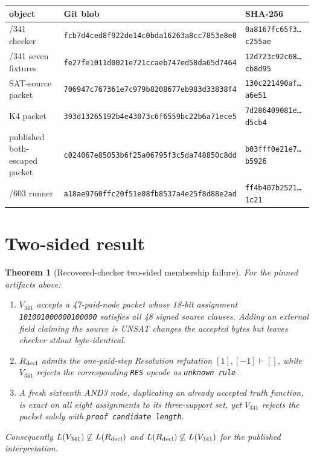 \documentclass[11pt]{article}
\newtheorem{theorem}{Theorem}
\begin{document}
\begin{center}
\small
\begin{tabular}{@{}lll@{}}
\toprule
object & Git blob & SHA-256\\
\midrule
/341 checker & \texttt{fcb7d4ced8f922de14c0bda16263a8cc7853e8e0} & \texttt{0a8167fc65f3\ldots c255ae}\\
/341 seven fixtures & \texttt{fe27fe1011d0021e721ccaeb747ed58da65d7464} & \texttt{12d723c92c68\ldots cb8d95}\\
SAT-source packet & \texttt{706947c767361e7c979b8208677eb983d33838f4} & \texttt{130c221490af\ldots a6e51}\\
K4 packet & \texttt{393d13265192b4e43073c6f6559bc22b6a71ece5} & \texttt{7d286409081e\ldots d5cb4}\\
published both-escaped packet & \texttt{c024067e85053b6f25a06795f3c5da748850c8dd} & \texttt{b03fff0e21e7\ldots b5926}\\
/603 runner & \texttt{a18ae9760ffc20f51e08fb8537a4e25f8d88e2ad} & \texttt{ff4b407b2521\ldots 1c21}\\
\bottomrule
\end{tabular}
\end{center}

\section{Two-sided result}

\begin{theorem}[Recovered-checker two-sided membership failure]
For the pinned artifacts above:
\begin{enumerate}
\item $V_{341}$ accepts a 47-paid-node packet whose 18-bit assignment
\texttt{101001000000100000} satisfies all 48 signed source clauses.  Adding an
external field claiming the source is UNSAT changes the accepted bytes but leaves
checker stdout byte-identical.
\item $R_{\rm decl}$ admits the one-paid-step Resolution refutation
$[1],[-1]\vdash []$, while $V_{341}$ rejects the corresponding \texttt{RES}
opcode as \texttt{unknown rule}.
\item A fresh sixteenth AND3 node, duplicating an already accepted truth function,
is exact on all eight assignments to its three-support set, yet $V_{341}$ rejects
the packet solely with \texttt{proof candidate length}.
\end{enumerate}
Consequently $L(V_{341})\not\subseteq L(R_{\rm decl})$ and
$L(R_{\rm decl})\not\subseteq L(V_{341})$ for the published interpretation.
\end{theorem}
\end{document}
